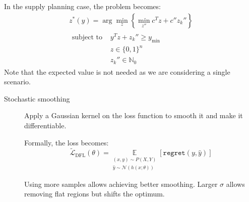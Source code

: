 \begin{description}
        \begin{example}
            In the supply planning case, the problem becomes:
            \[
                \begin{gathered}
                    z^*(y) = \arg\min_z \left\{ \min_{z''} c^Tz + c''z_k'' \right\} \\
                    \begin{aligned}
                        \text{subject to } &y^Tz + z_k'' \geq y_\text{min} \\
                        &z \in \{ 0, 1 \}^n \\
                        &z_k'' \in \mathbb{N}_0
                    \end{aligned}
                \end{gathered}
            \]
            Note that the expected value is not needed as we are considering a single scenario.
        \end{example}

        \begin{description}
            \item[Stochastic smoothing] 
                Apply a Gaussian kernel on the loss function to smooth it and make it differentiable.

                Formally, the loss becomes:
                \[ 
                    \tilde{\mathcal{L}}_\text{DFL}(\theta) =
                    \underset{\substack{(x, y) \sim P(X, Y)\\\hat{y} \sim \mathcal{N}(h(x; \theta))}}{\mathbb{E}}[ \texttt{regret}(y, \hat{y}) ]
                \]

                \begin{remark}
                    Using more samples allows achieving better smoothing. Larger $\sigma$ allows removing flat regions but shifts the optimum.
                \end{remark}


\end{description}
\end{description}
